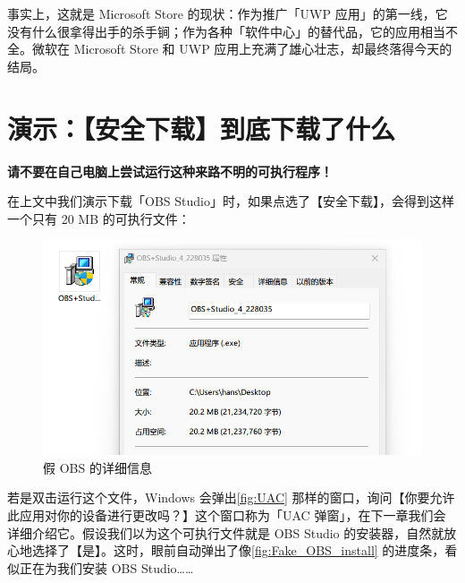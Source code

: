 {{事实上，这就是 Microsoft Store 的现状：作为推广「UWP 应用」的第一线，它没有什么很拿得出手的杀手锏；作为各种「软件中心」的替代品，它的应用相当不全。微软在 Microsoft Store 和 UWP 应用上充满了雄心壮志，却最终落得今天的结局。

\section{演示：【安全下载】到底下载了什么}

\begin{dangerbox}
  \textbf{请不要在自己电脑上尝试运行这种来路不明的可执行程序！}
\end{dangerbox}

在上文中我们演示下载「OBS Studio」时，如果点选了【安全下载】，会得到这样一个只有 20 MB 的可执行文件：

\begin{figure}[htb!]
  \centering
  \includegraphics[width=.65\textwidth]{assets/basic/Fake_OBS_installer.png}
  \caption{假 OBS 的详细信息}
  \label{fig:Fake_OBS_installer}
\end{figure}

若是双击运行这个文件，Windows 会弹出\autoref{fig:UAC} 那样的窗口，询问【你要允许此应用对你的设备进行更改吗？】这个窗口称为「UAC 弹窗」，在下一章我们会详细介绍它。假设我们以为这个可执行文件就是 OBS Studio 的安装器，自然就放心地选择了【是】。这时，眼前自动弹出了像\autoref{fig:Fake_OBS_install} 的进度条，看似正在为我们安装 OBS Studio……

}}
